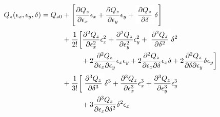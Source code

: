 \begin{equation}
\begin{aligned}
Q_z(\epsilon_x, \epsilon_y, \delta) = Q_{z0} &+ \left[\frac{\partial Q_z}{\partial \epsilon_x} \epsilon_x
                                                 + \frac{\partial Q_z}{\partial \epsilon_y} \epsilon_y
                                                 + \colorbox{yellow!0}{$\displaystyle \frac{\partial Q_z}{\partial \delta}$} \delta
                                                \right] \\
                                             &+ \frac{1}{2!} \biggl[\frac{\partial^2Q_z}{\partial \epsilon_x^2}\epsilon_x^2 
                                                 + \frac{\partial^2Q_z}{\partial \epsilon_y^2}\epsilon_y^2
                                                 + \colorbox{yellow!0}{$\displaystyle \frac{\partial^2 Q_z}{\partial \delta^2}$} \delta^2  \\
                                             &\;\begin{aligned}
                                             \phantom{+ \frac{1}{2!} \biggl[}
                                               &+ 2 \frac{\partial^2Q_z}{\partial \epsilon_x \partial \epsilon_y}\epsilon_x \epsilon_y
                                                  + 2 \frac{\partial^2Q_z}{\partial \epsilon_x \partial \delta}\epsilon_x \delta
                                                  + 2 \frac{\partial^2Q_z}{\partial \delta \partial \epsilon_y} \delta \epsilon_y
                                             \biggr] \\
                                             \end{aligned} \\
                                             &+ \frac{1}{3!}
                                             \biggl[
                                                  \colorbox{yellow!0}{$\displaystyle \frac{\partial^3 Q_z}{\partial \delta^3}$}\delta^{3}
                                                  + \frac{\partial^{3} Q_z}{\partial \epsilon_{x}^{3}}  \epsilon_{x}^{3} 
                                                  + \frac{\partial^{3} Q_z}{\partial \epsilon_{y}^{3}}  \epsilon_{y}^{3} \\
                                             &\;\begin{aligned}
                                             \phantom{+ \frac{1}{3!} \biggl[} 
                                               &+ 3 \frac{\partial^{3} Q_z}{\partial \epsilon_{x}\partial \delta^{2}} \delta^{2} \epsilon_{x} 

\end{aligned}
\end{aligned}
\end{equation}
